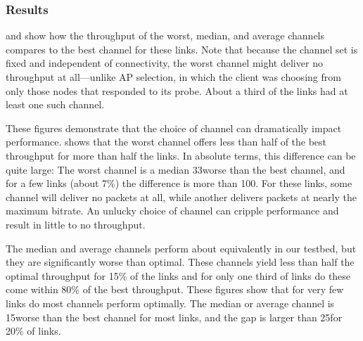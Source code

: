 \subsubsection{Results}
 and  show how the throughput of the worst, median, and average channels compares to the best channel for these links. Note that because the channel set is fixed and independent of connectivity, the worst channel might deliver no throughput at all---unlike AP selection, in which the client was choosing from only those nodes that responded to its probe. About a third of the links had at least one such channel.

These figures demonstrate that the choice of channel can dramatically impact performance.  shows that the worst channel offers less than half of the best throughput for more than half the links. In absolute terms, this difference can be quite large: The worst channel is a median 33\Mbps worse than the best channel, and for a few links (about 7\%) the difference is more than 100\Mbps. For these links, some channel will deliver no packets at all, while another delivers packets at nearly the maximum bitrate. An unlucky choice of channel can cripple performance and result in little to no throughput.

The median and average channels perform about equivalently in our testbed, but they are significantly worse than optimal. These channels yield less than half the optimal throughput for 15\% of the links and for only one third of links do these come within 80\% of the best throughput. These figures show that for very few links do most channels perform optimally. The median or average channel is 15\Mbps worse than the best channel for most links, and the gap is larger than 25\Mbps for 20\% of links.

